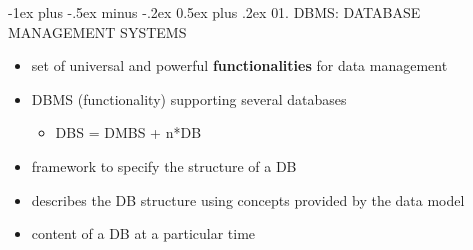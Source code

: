 \documentclass[10pt, landscape]{article}
\makeatletter
\renewcommand{\section}{\@startsection{section}{1}{0mm}%
  {-1ex plus -.5ex minus -.2ex}%
  {0.5ex plus .2ex}%
{\normalfont\large\bfseries}}
\makeatother
\begin{document}
\raggedright
\footnotesize
\begin{multicols}{3}

  \setlength{\columnseprule}{0.25pt}
  \setlength{\premulticols}{1pt}
  \setlength{\postmulticols}{1pt}
  \setlength{\multicolsep}{1pt}
  \setlength{\columnsep}{2pt}

  \begin{center}
  \end{center}

  \section{01. DBMS: DATABASE MANAGEMENT SYSTEMS}
  \begin{itemize}
    \item set of universal and powerful \textbf{functionalities}  for data management
    \item {} DBMS (functionality) supporting several databases
      \begin{itemize}
        \item DBS = DMBS + n*DB
      \end{itemize}
    \item {} framework to specify the structure of a DB
    \item {} describes the DB structure using concepts provided by the data model
    \item {} content of a DB at a particular time
  \end{itemize}


\end{multicols}
\end{document}
